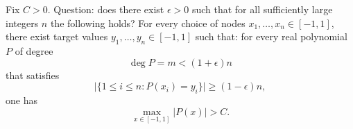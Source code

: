 Fix $C>0$.
Question: does there exist $\epsilon>0$ such that for all sufficiently large integers $n$ the following holds?
For every choice of nodes $x_1,\dots,x_n\in[-1,1]$, there exist target values $y_1,\dots,y_n\in[-1,1]$ such that:
for every real polynomial $P$ of degree
\[
\deg P = m < (1+\epsilon)n
\]
that satisfies
\[
\lvert\{1\le i\le n: P(x_i)=y_i\}\rvert\ge (1-\epsilon)n,
\]
one has
\[
\max_{x\in[-1,1]} |P(x)|>C.
\]

